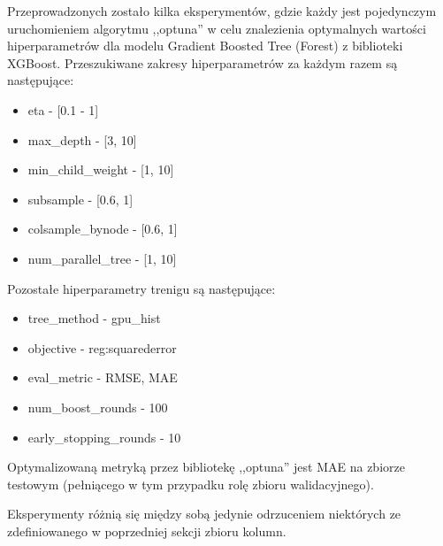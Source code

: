 \documentclass{classrep}
\begin{document}
{{{                Przeprowadzonych zostało kilka eksperymentów, gdzie każdy jest
                pojedynczym uruchomieniem algorytmu ,,optuna'' w celu znalezienia
                optymalnych wartości hiperparametrów dla modelu Gradient Boosted Tree
                (Forest) z biblioteki XGBoost. Przeszukiwane zakresy hiperparametrów za
                każdym razem są następujące:
                \begin{itemize}
                    \item eta - [0.1 - 1]
                    \item max\_depth - [3, 10]
                    \item min\_child\_weight - [1, 10]
                    \item subsample - [0.6, 1]
                    \item colsample\_bynode - [0.6, 1]
                    \item num\_parallel\_tree - [1, 10]
                \end{itemize}
                Pozostałe hiperparametry trenigu są następujące:
                \begin{itemize}
                    \item tree\_method - gpu\_hist
                    \item objective - reg:squarederror
                    \item eval\_metric - RMSE, MAE
                    \item num\_boost\_rounds - 100
                    \item early\_stopping\_rounds - 10
                \end{itemize}
                Optymalizowaną metryką przez bibliotekę ,,optuna'' jest MAE na zbiorze
                testowym (pełniącego w tym przypadku rolę zbioru walidacyjnego).

                Eksperymenty różnią się między sobą jedynie odrzuceniem niektórych ze
                zdefiniowanego w poprzedniej sekcji zbioru kolumn.
                
}}}
\end{document}
